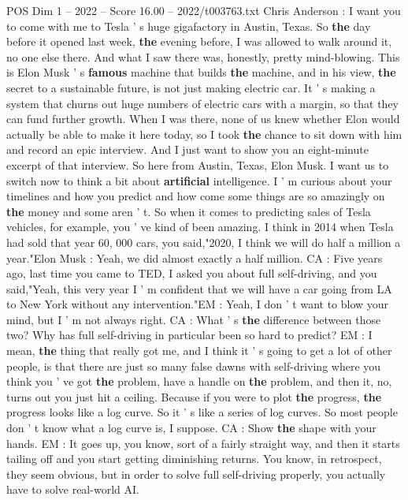 \begin{textsample}{POS Dim 1 – 2022 – Score 16.00 – 2022/t003763.txt}  \label{ex:f1_pos_071}
Chris Anderson : I want you to come with me to Tesla ' s huge gigafactory in Austin, Texas.
So \textbf{the} day before it opened last week, \textbf{the} evening before, I was allowed to walk around it, no one else there.
And what I saw there was, honestly, pretty mind-blowing.
This is Elon Musk ' s \textbf{famous} machine that builds \textbf{the} machine, and in his view, \textbf{the} secret to a sustainable future, is not just making electric car.
It ' s making a system that churns out huge numbers of electric cars with a margin, so that they can fund further growth.
When I was there, none of us knew whether Elon would actually be able to make it here today, so I took \textbf{the} chance to sit down with him and record an epic interview.
And I just want to show you an eight-minute excerpt of that interview.
So here from Austin, Texas, Elon Musk.
I want us to switch now to think a bit about \textbf{artificial} intelligence.
I ' m curious about your timelines and how you predict and how come some things are so amazingly on \textbf{the} money and some aren ' t.
So when it comes to predicting sales of Tesla vehicles, for example, you ' ve kind of been amazing.
I think in 2014 when Tesla had sold that year 60, 000 cars, you said,"2020, I think we will do half a million a year."Elon Musk : Yeah, we did almost exactly a half million.
CA : Five years ago, last time you came to TED, I asked you about full self-driving, and you said,"Yeah, this very year I ' m confident that we will have a car going from LA to New York without any intervention."EM : Yeah, I don ' t want to blow your mind, but I ' m not always right.
CA : What ' s \textbf{the} difference between those two?
Why has full self-driving in particular been so hard to predict?
EM : I mean, \textbf{the} thing that really got me, and I think it ' s going to get a lot of other people, is that there are just so many false dawns with self-driving where you think you ' ve got \textbf{the} problem, have a handle on \textbf{the} problem, and then it, no, turns out you just hit a ceiling.
Because if you were to plot \textbf{the} progress, \textbf{the} progress looks like a log curve.
So it ' s like a series of log curves.
So most people don ' t know what a log curve is, I suppose.
CA : Show \textbf{the} shape with your hands.
EM : It goes up, you know, sort of a fairly straight way, and then it starts tailing off and you start getting diminishing returns.
You know, in retrospect, they seem obvious, but in order to solve full self-driving properly, you actually have to solve real-world AI.

\end{textsample}
